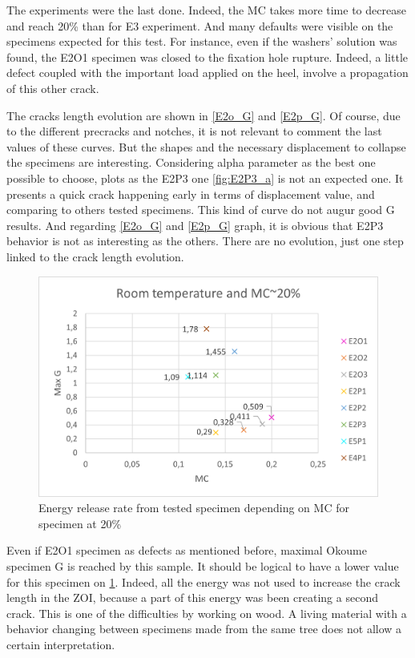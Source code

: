 The experiments were the last done. Indeed, the MC takes more time to decrease and reach 20\% than for E3 experiment. And many defaults were visible on the specimens expected for this test. For instance, even if the washers' solution was found, the E2O1 specimen was closed to the fixation hole rupture. Indeed, a little defect coupled with the important load applied on the heel, involve a propagation of this other crack. 

The cracks length evolution are shown in \ref{E2o_G} and \ref{E2p_G}. Of course, due to the different precracks and notches, it is not relevant to comment the last values of these curves. But the shapes and the necessary displacement to collapse the specimens are interesting. Considering alpha parameter as the best one possible to choose, plots as the E2P3 one \ref{fig:E2P3_a} is not an expected one. It presents a quick crack happening early in terms of displacement value, and comparing to others tested specimens. This kind of curve do not augur good G results. And regarding \ref{E2o_G} and \ref{E2p_G} graph, it is obvious that E2P3 behavior is not as interesting as the others. There are no evolution, just one step linked to the crack length evolution.

\begin{figure}[th]
	\centering
	\includegraphics[width=\textwidth]{Figures/Res_MC20}
	\caption[G depending on MC for specimen at 20\%]{Energy release rate from tested specimen depending on MC for specimen at 20\%}
	\label{fig:Res_MC20}
\end{figure}

Even if E2O1 specimen as defects as mentioned before, maximal Okoume specimen G is reached by this sample. It should be logical to have a lower value for this specimen on \ref{fig:Res_MC20}. Indeed, all the energy was not used to increase the crack length in the ZOI, because a part of this energy was been creating a second crack. This is one of the difficulties by working on wood. A living material with a behavior changing between specimens made from the same tree does not allow a certain interpretation.

